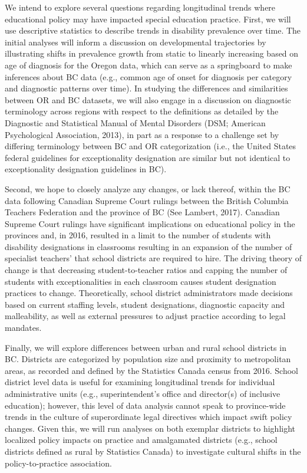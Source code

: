 \documentclass[
  english,
  man,floatsintext]{apa6}
\begin{document}
We intend to explore several questions regarding longitudinal trends where educational policy may have impacted special education practice. First, we will use descriptive statistics to describe trends in disability prevalence over time. The initial analyses will inform a discussion on developmental trajectories by illustrating shifts in prevalence growth from static to linearly increasing based on age of diagnosis for the Oregon data, which can serve as a springboard to make inferences about BC data (e.g., common age of onset for diagnosis per category and diagnostic patterns over time). In studying the differences and similarities between OR and BC datasets, we will also engage in a discussion on diagnostic terminology across regions with respect to the definitions as detailed by the Diagnostic and Statistical Manual of Mental Disorders (DSM; American Psychological Association, 2013), in part as a response to a challenge set by differing terminology between BC and OR categorization (i.e., the United States federal guidelines for exceptionality designation are similar but not identical to exceptionality designation guidelines in BC).

Second, we hope to closely analyze any changes, or lack thereof, within the BC data following Canadian Supreme Court rulings between the British Columbia Teachers Federation and the province of BC (See Lambert, 2017). Canadian Supreme Court rulings have significant implications on educational policy in the provinces and, in 2016, resulted in a limit to the number of students with disability designations in classrooms resulting in an expansion of the number of specialist teachers' that school districts are required to hire. The driving theory of change is that decreasing student-to-teacher ratios and capping the number of students with exceptionalities in each classroom causes student designation practices to change. Theoretically, school district administrators made decisions based on current staffing levels, student designations, diagnostic capacity and malleability, as well as external pressures to adjust practice according to legal mandates.

Finally, we will explore differences between urban and rural school districts in BC. Districts are categorized by population size and proximity to metropolitan areas, as recorded and defined by the Statistics Canada census from 2016. School district level data is useful for examining longitudinal trends for individual administrative units (e.g., superintendent's office and director(s) of inclusive education); however, this level of data analysis cannot speak to province-wide trends in the culture of superordinate legal directives which impact swift policy changes. Given this, we will run analyses on both exemplar districts to highlight localized policy impacts on practice and amalgamated districts (e.g., school districts defined as rural by Statistics Canada) to investigate cultural shifts in the policy-to-practice association.
\end{document}
